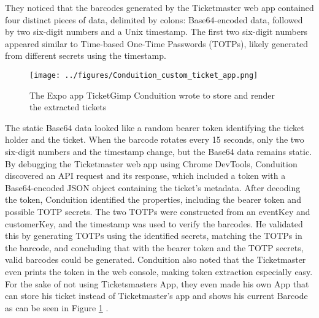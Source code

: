 They noticed that the barcodes generated by the Ticketmaster web app contained four distinct pieces of data, 
delimited by colons: Base64-encoded data, followed by two six-digit numbers and a Unix timestamp. 
The first two six-digit numbers appeared similar to Time-based One-Time Passwords (TOTPs), 
likely generated from different secrets using the timestamp.

\begin{figure}[H]
    \begin{center}
    \texttt{[image: ../figures/Conduition\_custom\_ticket\_app.png]}
    \caption{The Expo app TicketGimp Conduition wrote to store and render the extracted tickets \cite{reverse_engineering_ticketmaster}}
    \label{fig:conduition_custom_app}
    \end{center}
\end{figure}

The static Base64 data looked like a random bearer token identifying the ticket holder and the ticket. 
When the barcode rotates every 15 seconds, only the two six-digit numbers and the timestamp change, but the Base64 data remains static. 
By debugging the Ticketmaster web app using Chrome DevTools, Conduition discovered an API request and its response, 
which included a token with a Base64-encoded JSON object containing the ticket's metadata. 
After decoding the token, Conduition identified the properties, including the bearer token and possible TOTP secrets.
The two TOTPs were constructed from an eventKey and customerKey, and the timestamp was used to verify the barcodes. 
He validated this by generating TOTPs using the identified secrets, matching the TOTPs in the barcode, 
and concluding that with the bearer token and the TOTP secrets, valid barcodes could be generated.
Conduition also noted that the Ticketmaster even prints the token in the web console, making token extraction especially easy.
For the sake of not using Ticketsmasters App, they even made his own App that can store his ticket instead of Ticketmaster's app and shows his current Barcode as can be seen in Figure \ref{fig:conduition_custom_app} \cite{reverse_engineering_ticketmaster}.
